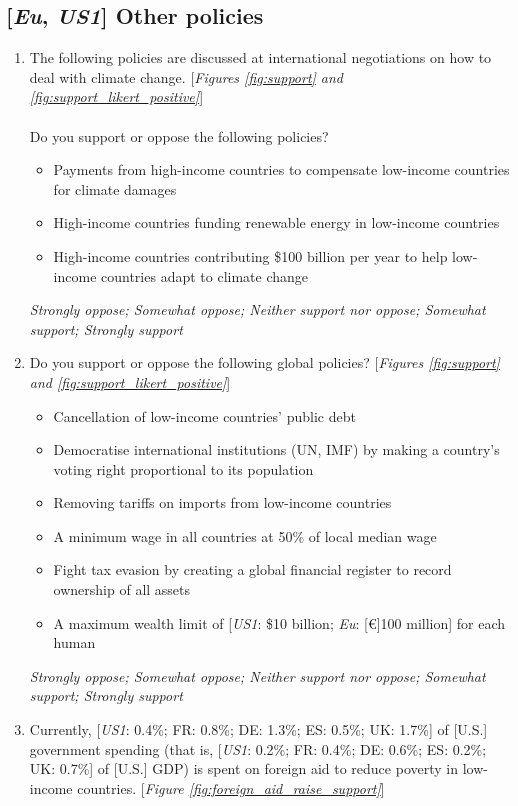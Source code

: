 \documentclass[12pt,english]{article}
\begin{document}
\subsection*{[\textit{Eu}, \textit{US1}] Other policies}
\begin{enumerate}[resume] \item \label{q:climate_policies} The following policies are discussed  at international negotiations on how to deal with climate change. [\textit{Figures \ref{fig:support} and \ref{fig:support_likert_positive}}]\\
\\
Do you support or oppose the following policies?
\begin{itemize}
    \item Payments from high-income countries to compensate low-income countries for climate damages 
    \item High-income countries funding renewable energy in low-income countries
    \item High-income countries contributing \$100 billion per year to help low-income countries adapt to climate change
\end{itemize}
\textit{Strongly oppose; Somewhat oppose; Neither support nor oppose; Somewhat support; Strongly support}
\item \label{q:other_policies} Do you support or oppose the following global policies? [\textit{Figures \ref{fig:support} and \ref{fig:support_likert_positive}}]
\begin{itemize}
    \item Cancellation of low-income countries' public debt 
    \item Democratise international institutions (UN, IMF) by making a country's voting right proportional to its population 
    \item Removing tariffs on imports from low-income countries
    \item A minimum wage in all countries at 50\% of local median wage
    \item Fight tax evasion by creating a global financial register to record ownership of all assets
    \item A maximum wealth limit of [\textit{US1}: \$10 billion; \textit{Eu}: [\euro{}]100 million] for each human 
\end{itemize}
\textit{Strongly oppose; Somewhat oppose; Neither support nor oppose; Somewhat support; Strongly support}
\item \label{q:foreign_aid_raise_support} Currently, [\textit{US1}: 0.4\%; FR: 0.8\%; DE: 1.3\%; ES: 0.5\%; UK: 1.7\%] of [U.S.] government spending (that is, [\textit{US1}: 0.2\%; FR: 0.4\%; DE: 0.6\%; ES: 0.2\%; UK: 0.7\%] of [U.S.] GDP) is spent on foreign aid to reduce poverty in low-income countries. [\textit{Figure \ref{fig:foreign_aid_raise_support}}]\\

\end{enumerate}
\end{document}

